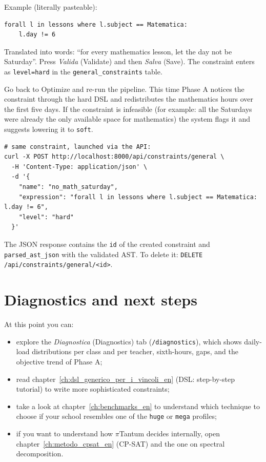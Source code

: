 Example (literally pasteable):

\begin{lstlisting}
forall l in lessons where l.subject == Matematica:
    l.day != 6
\end{lstlisting}

Translated into words: ``for every mathematics lesson, let the
day not be Saturday''. Press \emph{Valida} (Validate) and then
\emph{Salva} (Save). The constraint enters as \texttt{level=hard}
in the \texttt{general\_constraints} table.

Go back to Optimize and re-run the pipeline. This time Phase A
notices the constraint through the hard DSL and redistributes the
mathematics hours over the first five days. If the constraint is
infeasible (for example: all the Saturdays were already the only
available space for mathematics) the system flags it and suggests
lowering it to \texttt{soft}.

\begin{esempiobox}[title=Try it now]
\begin{lstlisting}[style=shell]
# same constraint, launched via the API:
curl -X POST http://localhost:8000/api/constraints/general \
  -H 'Content-Type: application/json' \
  -d '{
    "name": "no_math_saturday",
    "expression": "forall l in lessons where l.subject == Matematica: l.day != 6",
    "level": "hard"
  }'
\end{lstlisting}
The JSON response contains the \texttt{id} of the created
constraint and \texttt{parsed\_ast\_json} with the validated AST.
To delete it: \texttt{DELETE /api/constraints/general/<id>}.
\end{esempiobox}

\section{Diagnostics and next steps}

At this point you can:

\begin{itemize}
\item explore the \emph{Diagnostica} (Diagnostics) tab
  (\texttt{/diagnostics}), which shows daily-load distributions
  per class and per teacher, sixth-hours, gaps, and the objective
  trend of Phase A;
\item read chapter~\ref{ch:dsl_generico_per_i_vincoli_en}
  (DSL: step-by-step tutorial) to write more sophisticated
  constraints;
\item take a look at chapter~\ref{ch:benchmarks_en} to understand
  which technique to choose if your school resembles one of the
  \texttt{huge} or \texttt{mega} profiles;
\item if you want to understand how $\pi$Tantum decides
  internally, open chapter~\ref{ch:metodo_cpsat_en} (CP-SAT) and the
  one on spectral decomposition.
\end{itemize}

